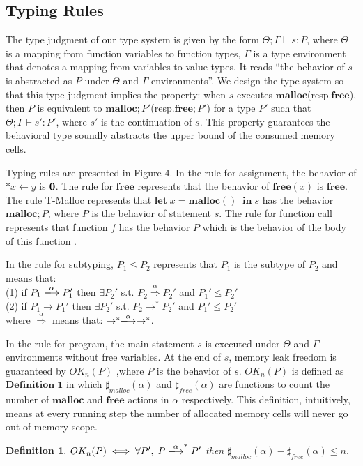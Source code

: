 \documentclass[english]{jssst_ppl} %
\newcommand\LET{\mathbf{let}\;}
\newcommand\IN{\mathbf{in}\;}
\newcommand\MALLOC{\mathbf{malloc()}\;}
\newcommand\Malloc{\mathbf{malloc}}
\newcommand\Free{\mathbf{free}}
\newcommand\Cirx{(x)}
\newtheorem{myDef}{Definition}
\begin{document}
\subsection{Typing Rules}
The type judgment of our type system is given by the form $\Theta ; \Gamma \vdash s : P$, where $\Theta$ is a mapping from function variables to function types, $\Gamma$ is a type environment that denotes a mapping from variables to value types.
It reads ``the behavior of $s$ is abstracted as $P$ under $\Theta$ and $\Gamma$ environments''. We design the type system so that this type judgment implies the property: when $s$ executes $\Malloc$(resp.$\Free$), then $P$ is equivalent to $\Malloc;P'$(resp.$\Free;P'$) for a type $P'$ such that $\Theta; \Gamma \vdash s': P'$, where $s'$ is the continuation of $s$. This property guarantees the behavioral type soundly abstracts the upper bound of the consumed memory cells.

Typing rules are presented in Figure 4. In the rule for assignment, the behavior of  $*x \leftarrow y$ is $\bf 0$. The rule for $\Free$ represents that the behavior of $\Free \Cirx$ is $\Free$. The rule T-Malloc represents that $\LET x = \MALLOC \; \IN s$ has the behavior $\Malloc;P$, where $P$ is the behavior of statement $s$. The rule for function call represents that function $f$ has the behavior $P$ which is the behavior of the body of this function .

In the rule for subtyping, $P_{1} \le P_{2}$ represents that $P_{1}$ is the subtype of $P_{2}$ and  means that: \\
(1) if $P_{1} \xlongrightarrow{\alpha}  P_{1}'$ then $\exists P_{2}' $ s.t. $P_{2} \overset{\text{$\alpha$}}{\Longrightarrow} P_{2}'$ and $ P_{1}' \le P_{2}' $\\
(2) if $P_{1} \rightarrow P_{1}'$ then $\exists P_{2}'$ s.t. $P_{2} \rightarrow^{*} P_{2}'$ and  $P_{1}' \le P_{2}'$\\
where $\overset{\text{$\alpha$}}{\Longrightarrow}$ means that: $\rightarrow^{*} \xlongrightarrow{\alpha} \rightarrow^{*}$.

In the rule for program, the main statement $s$ is executed under $\Theta$ and $\Gamma$ environments without free variables. At the end of $s$, memory leak freedom is guaranteed by $OK_{n}(P)$ ,where $P$ is the behavior of $s$. $OK_{n}(P)$ is defined as $\mathbf{Definition\; 1}$ in which $\sharp_{malloc}(\alpha)$ and $\sharp_{free}(\alpha)$ are functions to count the number of $\Malloc$ and $\Free$ actions in $\alpha$ respectively. This definition, intuitively, means at every running step the number of allocated memory cells will never go out of memory scope.
\begin{myDef}
 $OK_{n}(P) \iff \forall P',\; P \xlongrightarrow{\alpha}^{*}P'$ then $\sharp_{malloc}(\alpha)-\sharp_{free}(\alpha)\le n$.
\end{myDef}
\end{document}
